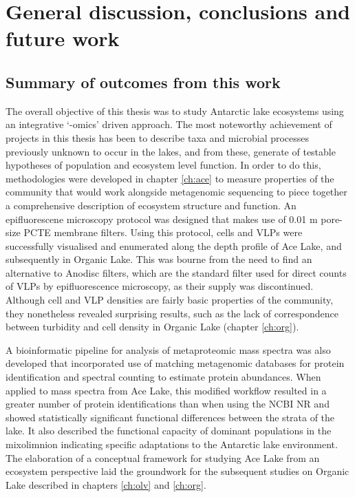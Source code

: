 \chapter{General discussion, conclusions and future work}
\label{ch:conc}
\acresetall

\section{Summary of outcomes from this work}
The overall objective of this thesis was to study Antarctic lake ecosystems using an integrative `-omics' driven approach.
The most noteworthy achievement of projects in this thesis has been to describe taxa and microbial processes previously unknown to occur in the lakes, and from these,  generate of testable hypotheses of population and ecosystem level function.
In order to do this, methodologies were developed in chapter \ref{ch:ace} to measure properties of the community that would work alongside metagenomic sequencing to piece together a comprehensive description of ecosystem structure and function.
An epifluorescene microscopy protocol was designed that makes use of 0.01 \textmu{}m pore-size \ac{PCTE} membrane filters.
Using this protocol, cells and \acp{VLP} were successfully visualised and enumerated along the depth profile of Ace Lake, and subsequently in Organic Lake.
This was bourne from the need to find an alternative to Anodisc filters, which are the standard filter used for direct counts of \acp{VLP} by epifluorescence microscopy, as their supply was discontinued.
Although cell and \ac{VLP} densities are fairly basic properties of the community, they nonetheless revealed surprising results, such as the lack of correspondence between turbidity and cell density in Organic Lake (chapter \ref{ch:org}).

A bioinformatic pipeline for analysis of metaproteomic mass spectra was also developed that incorporated use of matching metagenomic databases for protein identification and spectral counting to estimate protein abundances.
When applied to mass spectra from Ace Lake, this modified workflow resulted in a greater number of protein identifications than when using the \ac{NCBI} \ac{NR} and showed statistically significant functional differences between the strata of the lake.
It also described the functional capacity of dominant populations in the mixolimnion indicating specific adaptations to the Antarctic lake environment.
The elaboration of a conceptual framework for studying Ace Lake from an ecosystem perspective laid the groundwork for the subsequent studies on Organic Lake described in chapters \ref{ch:olv} and \ref{ch:org}.

